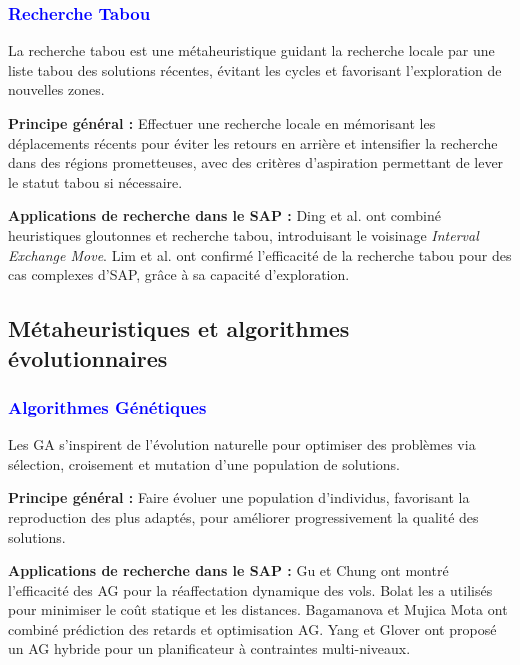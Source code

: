 \vspace{-0.7em}
\subsubsection*{\small{\textcolor{blue}{Recherche Tabou}}}


La recherche tabou est une métaheuristique guidant la recherche locale par une liste tabou des solutions récentes, évitant les cycles et favorisant l’exploration de nouvelles zones.

\textbf{Principe général :}  
Effectuer une recherche locale en mémorisant les déplacements récents pour éviter les retours en arrière et intensifier la recherche dans des régions prometteuses, avec des critères d’aspiration permettant de lever le statut tabou si nécessaire.

\textbf{Applications de recherche dans le SAP :}  
Ding et al. \cite{Ding_2004} ont combiné heuristiques gloutonnes et recherche tabou, introduisant le voisinage \textit{Interval Exchange Move}.  
Lim et al. \cite{Lim_2005} ont confirmé l’efficacité de la recherche tabou pour des cas complexes d’\ac{SAP}, grâce à sa capacité d’exploration.

\vspace{-0.5em}
\subsection*{Métaheuristiques et algorithmes évolutionnaires}

\vspace{-0.5em}
\subsubsection*{\small{\textcolor{blue}{Algorithmes Génétiques}}}
\label{sec:GA}
\vspace{-0.5em}

Les \ac{GA} s’inspirent de l’évolution naturelle pour optimiser des problèmes via sélection, croisement et mutation d’une population de solutions.

\textbf{Principe général :}  
Faire évoluer une population d’individus, favorisant la reproduction des plus adaptés, pour améliorer progressivement la qualité des solutions.

\textbf{Applications de recherche dans le SAP :}  
Gu et Chung \cite{Gu_1999} ont montré l’efficacité des AG pour la réaffectation dynamique des vols.  
Bolat \cite{Bolat_2001} les a utilisés pour minimiser le coût statique et les distances.  
Bagamanova et Mujica Mota \cite{Bagamanova_2018} ont combiné prédiction des retards et optimisation AG.  
Yang et Glover \cite{Yang_2007} ont proposé un AG hybride pour un planificateur à contraintes multi-niveaux.



